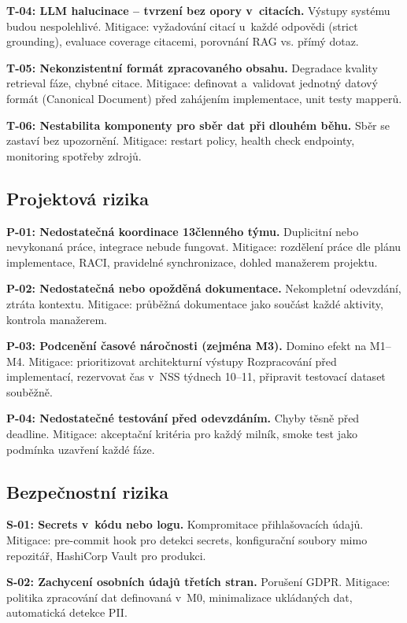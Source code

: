 \documentclass[a4paper, 11pt]{article}
\begin{document}
\textbf{T-04: LLM halucinace -- tvrzení bez opory v~citacích.} Výstupy systému budou nespolehlivé. Mitigace: vyžadování citací u~každé odpovědi (strict grounding), evaluace coverage citacemi, porovnání RAG vs. přímý dotaz.

\textbf{T-05: Nekonzistentní formát zpracovaného obsahu.} Degradace kvality retrieval fáze, chybné citace. Mitigace: definovat a~validovat jednotný datový formát (Canonical Document) před zahájením implementace, unit testy mapperů.

\textbf{T-06: Nestabilita komponenty pro sběr dat při dlouhém běhu.} Sběr se zastaví bez upozornění. Mitigace: restart policy, health check endpointy, monitoring spotřeby zdrojů.

\subsection{Projektová rizika}

\textbf{P-01: Nedostatečná koordinace 13členného týmu.} Duplicitní nebo nevykonaná práce, integrace nebude fungovat. Mitigace: rozdělení práce dle plánu implementace, RACI, pravidelné synchronizace, dohled manažerem projektu.

\textbf{P-02: Nedostatečná nebo opožděná dokumentace.} Nekompletní odevzdání, ztráta kontextu. Mitigace: průběžná dokumentace jako součást každé aktivity, kontrola manažerem.

\textbf{P-03: Podcenění časové náročnosti (zejména M3).} Domino efekt na M1--M4. Mitigace: prioritizovat architekturní výstupy Rozpracování před implementací, rezervovat čas v~NSS týdnech 10--11, připravit testovací dataset souběžně.

\textbf{P-04: Nedostatečné testování před odevzdáním.} Chyby těsně před deadline. Mitigace: akceptační kritéria pro každý milník, smoke test jako podmínka uzavření každé fáze.

\subsection{Bezpečnostní rizika}

\textbf{S-01: Secrets v~kódu nebo logu.} Kompromitace přihlašovacích údajů. Mitigace: pre-commit hook pro detekci secrets, konfigurační soubory mimo repozitář, HashiCorp Vault pro produkci.

\textbf{S-02: Zachycení osobních údajů třetích stran.} Porušení GDPR. Mitigace: politika zpracování dat definovaná v~M0, minimalizace ukládaných dat, automatická detekce PII.
\end{document}
